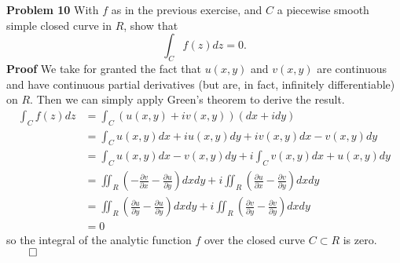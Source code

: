 \documentclass[11pt, letterpaper]{article}
\begin{document}
    {\bf Problem 10} With $f$ as in the previous exercise, and $C$ a piecewise smooth simple closed curve in $R$, show that
    \[\int_Cf(z)dz=0.\]
    {\bf Proof} We take for granted the fact that $u(x,y)$ and $v(x,y)$ are continuous and have continuous partial derivatives (but are, in fact, infinitely differentiable) on $R$. Then we can simply apply Green's theorem to derive the result.
    \begin{align*}
        \int_Cf(z)dz&=\int_C(u(x,y)+iv(x,y))(dx+idy)\\
        &=\int_Cu(x,y)dx+iu(x,y)dy+iv(x,y)dx-v(x,y)dy\\
        &=\int_Cu(x,y)dx-v(x,y)dy+i\int_Cv(x,y)dx+u(x,y)dy\\
        &=\iint_R\left(-\frac{\partial v}{\partial x}-\frac{\partial u}{\partial y}\right)dxdy+i\iint_R\left(\frac{\partial u}{\partial x}-\frac{\partial v}{\partial y}\right)dxdy\tag{Green's theorem}\\
        &=\iint_R\left(\frac{\partial u}{\partial y}-\frac{\partial u}{\partial y}\right)dxdy+i\iint_R\left(\frac{\partial v}{\partial y}-\frac{\partial v}{\partial y}\right)dxdy\tag{by (5)}\\
        &=0
    \end{align*}
    so the integral of the analytic function $f$ over the closed curve $C\subset R$ is zero.\hfill{$\qed$}
\end{document}
